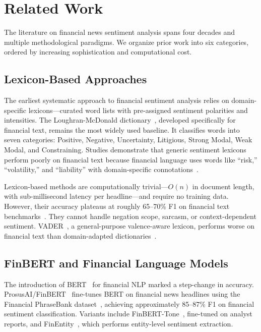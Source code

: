 \section{Related Work}
\label{sec:related}

The literature on financial news sentiment analysis spans four decades and multiple methodological paradigms. We organize prior work into six categories, ordered by increasing sophistication and computational cost.

\subsection{Lexicon-Based Approaches}

The earliest systematic approach to financial sentiment analysis relies on domain-specific lexicons---curated word lists with pre-assigned sentiment polarities and intensities. The Loughran-McDonald dictionary~\cite{loughran2011liability}, developed specifically for financial text, remains the most widely used baseline. It classifies words into seven categories: Positive, Negative, Uncertainty, Litigious, Strong Modal, Weak Modal, and Constraining. Studies demonstrate that generic sentiment lexicons perform poorly on financial text because financial language uses words like ``risk,'' ``volatility,'' and ``liability'' with domain-specific connotations~\cite{loughran2011liability}.

Lexicon-based methods are computationally trivial---$O(n)$ in document length, with sub-millisecond latency per headline---and require no training data. However, their accuracy plateaus at roughly 65--70\% F1 on financial text benchmarks~\cite{catelli2022lexicon}. They cannot handle negation scope, sarcasm, or context-dependent sentiment. VADER~\cite{hutto2014vader}, a general-purpose valence-aware lexicon, performs worse on financial text than domain-adapted dictionaries~\cite{singh2024stochastic}.

\subsection{FinBERT and Financial Language Models}

The introduction of BERT~\cite{devlin2019bert} for financial NLP marked a step-change in accuracy. ProsusAI/FinBERT~\cite{finbert2020} fine-tunes BERT on financial news headlines using the Financial PhraseBank dataset~\cite{malo2014phrasebank}, achieving approximately 85--87\% F1 on financial sentiment classification. Variants include FinBERT-Tone~\cite{finberttone2021}, fine-tuned on analyst reports, and FinEntity~\cite{tang2023fmentity}, which performs entity-level sentiment extraction.

